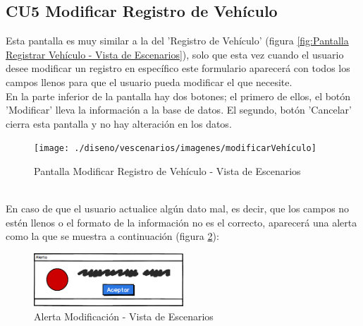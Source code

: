 \subsection{CU5 Modificar Registro de Vehículo}
Esta pantalla es muy similar a la del 'Registro de Vehículo' (figura \ref{fig:Pantalla Registrar Vehículo - Vista de Escenarios}), solo que esta vez cuando el usuario desee modificar un registro en específico este formulario aparecerá con todos los campos llenos para que el usuario pueda modificar el que necesite. 
\\
En la parte inferior de la pantalla hay dos botones; el primero de ellos, el botón 'Modificar' lleva la información a la base de datos. El segundo, botón 'Cancelar' cierra esta pantalla y no hay alteración en los datos. 
\begin{figure}[!h]
	\centering
	\texttt{[image: ./diseno/vescenarios/imagenes/modificarVehículo]}
	\caption{Pantalla Modificar Registro de Vehículo - Vista de Escenarios}
	\label{fig:Pantalla Modificar Registro de Vehículo - Vista de Escenarios}
\end{figure}
\\
En caso de que el usuario actualice algún dato mal, es decir, que los campos no estén llenos o el formato de la información no es el correcto, aparecerá una alerta como la que se muestra a continuación (figura \ref{fig:Alerta3 - Vista de Escenarios}):
\begin{figure}[!h]
	\centering
	\includegraphics[width=0.5\textwidth]{./diseno/vescenarios/imagenes/alerta}
	\caption{Alerta Modificación - Vista de Escenarios}
	\label{fig:Alerta3 - Vista de Escenarios}
\end{figure}
\clearpage